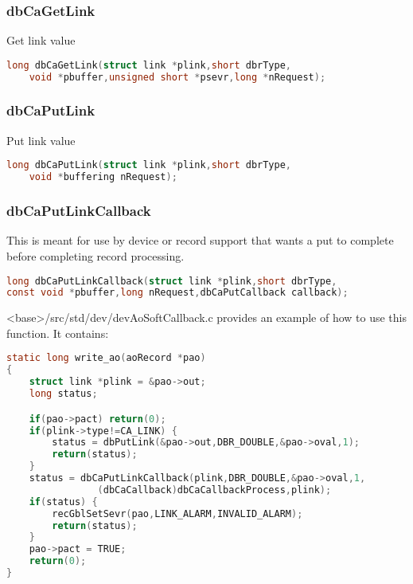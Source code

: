\subsubsection{dbCaGetLink}

Get link value

\begin{lstlisting}[language=C]
long dbCaGetLink(struct link *plink,short dbrType,
    void *pbuffer,unsigned short *psevr,long *nRequest);
\end{lstlisting}

\subsubsection{dbCaPutLink}

Put link value

\begin{lstlisting}[language=C]
long dbCaPutLink(struct link *plink,short dbrType,
    void *buffering nRequest);
\end{lstlisting}

\subsubsection{dbCaPutLinkCallback}

This is meant for use by device or record support that wants a put to complete before completing record processing.

\begin{lstlisting}[language=C]
long dbCaPutLinkCallback(struct link *plink,short dbrType,
const void *pbuffer,long nRequest,dbCaPutCallback callback);
\end{lstlisting}

\textless{}base\textgreater{}/src/std/dev/devAoSoftCallback.c provides an example of how to use this function.
It contains:

\begin{lstlisting}[language=C]
static long write_ao(aoRecord *pao)
{
    struct link *plink = &pao->out;
    long status;

    if(pao->pact) return(0);
    if(plink->type!=CA_LINK) {
        status = dbPutLink(&pao->out,DBR_DOUBLE,&pao->oval,1);
        return(status);
    }
    status = dbCaPutLinkCallback(plink,DBR_DOUBLE,&pao->oval,1,
                (dbCaCallback)dbCaCallbackProcess,plink);
    if(status) {
        recGblSetSevr(pao,LINK_ALARM,INVALID_ALARM);
        return(status);
    }
    pao->pact = TRUE;
    return(0);
}
\end{lstlisting}


